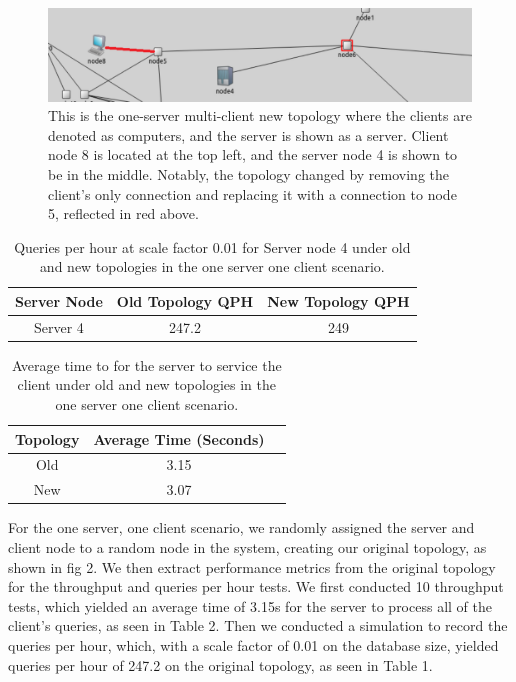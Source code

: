 \begin{figure}[tp]
\centering
\includegraphics[width=0.5 \textwidth]{figures/SingleClientNew}
\caption{This is the one-server multi-client new topology where the clients are denoted as computers, and the server is shown as a server. Client node 8 is located at the top left, and the server node 4 is shown to be in the middle. Notably, the topology changed by removing the client's only connection and replacing it with a connection to node 5, reflected in red above.
}
\end{figure}

\begin{table}[h!]
\centering
\begin{tabular}{|c|c|c|}
\hline
Server Node & Old Topology QPH & New Topology QPH \\ \hline
Server 4 & 247.2 & 249 \\ \hline
\end{tabular}
\caption{Queries per hour at scale factor 0.01 for Server node 4 under old and new topologies in the one server one client scenario.}
\label{tab:my_label}
\end{table}


\begin{table}[h!]
\centering
\begin{tabular}{|c|c|c|}
\hline
Topology & Average Time (Seconds) \\ \hline
Old & 3.15 \\ \hline
New & 3.07 \\ \hline
\end{tabular}
\caption{Average time to for the server to service the client under old and new topologies in the one server one client scenario.
}
\label{tab:avg_time_all_clients}
\end{table}


For the one server, one client scenario, we randomly assigned the server and client node to a random node in the system, creating our original topology, as shown in fig 2. We then extract performance metrics from the original topology for the throughput and queries per hour tests. We first conducted 10 throughput tests, which yielded an average time of 3.15s for the server to process all of the client's queries, as seen in Table 2. Then we conducted a simulation to record the queries per hour, which, with a scale factor of 0.01 on the database size, yielded queries per hour of 247.2 on the original topology, as seen in Table 1.


